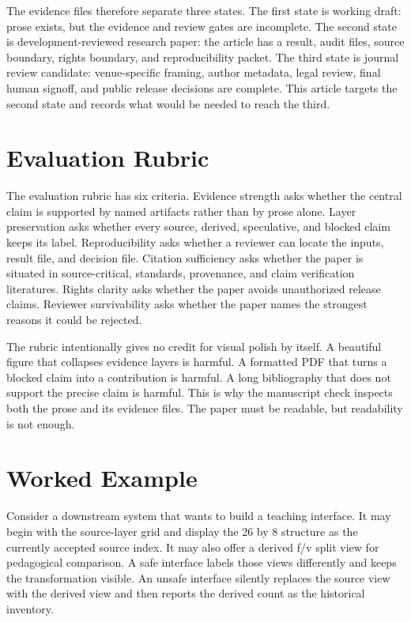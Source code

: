 \documentclass[sigconf,nonacm]{acmart}
\begin{document}
The evidence files therefore separate three states. The first state is working
draft: prose exists, but the evidence and review gates are incomplete. The
second state is development-reviewed research paper: the article has a result,
audit files, source boundary, rights boundary, and reproducibility packet. The
third state is journal review candidate: venue-specific framing, author
metadata, legal review, final human signoff, and public release decisions are
complete. This article targets the second state and records what would be needed
to reach the third.

\section{Evaluation Rubric}
The evaluation rubric has six criteria. Evidence strength asks whether the
central claim is supported by named artifacts rather than by prose alone.
Layer preservation asks whether every source, derived, speculative, and blocked
claim keeps its label. Reproducibility asks whether a reviewer can locate the
inputs, result file, and decision file. Citation sufficiency asks whether the
paper is situated in source-critical, standards, provenance, and claim
verification literatures. Rights clarity asks whether the paper avoids
unauthorized release claims. Reviewer survivability asks whether the paper names
the strongest reasons it could be rejected.

The rubric intentionally gives no credit for visual polish by itself. A
beautiful figure that collapses evidence layers is harmful. A formatted PDF that
turns a blocked claim into a contribution is harmful. A long bibliography that
does not support the precise claim is harmful. This is why the manuscript check
inspects both the prose and its evidence files. The paper must be readable, but
readability is not enough.

\section{Worked Example}
Consider a downstream system that wants to build a teaching interface. It may
begin with the source-layer grid and display the 26 by 8 structure as the
currently accepted source index. It may also offer a derived f/v split view for
pedagogical comparison. A safe interface labels those views differently and
keeps the transformation visible. An unsafe interface silently replaces the
source view with the derived view and then reports the derived count as the
historical inventory.
\end{document}

